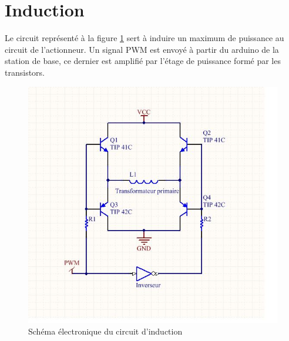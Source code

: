 \section{Induction}

Le circuit représenté à la figure \ref{fig:induction} sert à induire un maximum de puissance au circuit de l'actionneur.
Un signal PWM est envoyé à partir du arduino de la station de base, ce dernier est amplifié par l'étage de puissance formé par les transistors.

\begin{figure}[ht]
  \centering
  \includegraphics[scale=0.4]{resources/induction.png}
  \caption{Schéma électronique du circuit d'induction}
  \label{fig:induction}
\end{figure}
